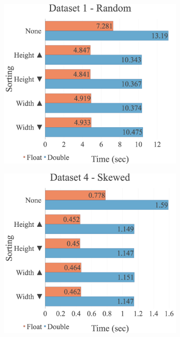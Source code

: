\begin{figure}[H]
\centering
\begin{subfigure}{.49\textwidth}
  \centering
  \includegraphics[width=1\linewidth]{img/experiments/multi-sorts-1_RAND.png}
\end{subfigure}
\begin{subfigure}{.49\textwidth}
  \centering
  \includegraphics[width=1\linewidth]{img/experiments/multi-sorts-4_SKEWED.png}

\end{subfigure}
\end{figure}
